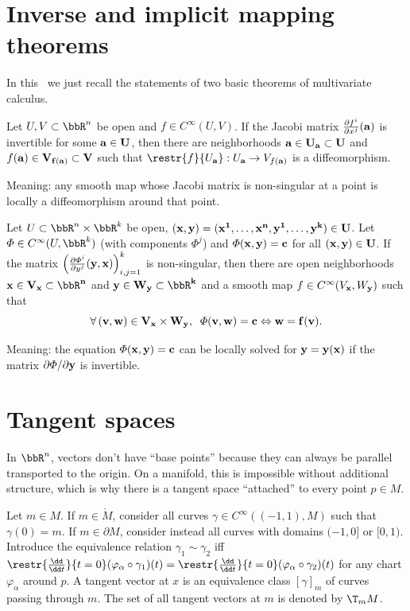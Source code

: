 \section{Inverse and implicit mapping theorems}

In this \sect\ we just recall the statements of two basic theorems of multivariate calculus.
\begin{thm}\label{InMT}
    Let $U,V\subset\bbR^n$ be open and $f\in C^\infty(U,V)$. If the Jacobi matrix $\frac{\partial f^i}{\partial x^j} (\bf{a})$ is invertible for some $\bf{a}\in U$, then there are neighborhoods $\bf{a}\in U_{\bf{a}}\subset U$ and $f(\bf{a})\in V_{f(\bf{a})}\subset V$ such that $\restr{f}{U_{\bf{a}}}:U_{\bf{a}}\to V_{f(\bf{a})}$ is a diffeomorphism.
\end{thm}
Meaning: any smooth map whose Jacobi matrix is non-singular at a point is locally a diffeomorphism around that point.

\begin{thm}\label{ImMT}
    Let $U\subset \bbR^n\times \bbR^k$ be open, $(\bf{x},\bf{y})=(x^1,\ldots,x^n,y^1,\ldots,y^k)\in U$. Let $\varPhi\in C^\infty(U,\bbR^k)$ (with components $\varPhi^j$) and $\varPhi(\bf{x},\bf{y})=\bf{c}$ for all $(\bf{x},\bf{y})\in U$. If the matrix $\left(\frac{\partial\varPhi^i}{\partial y^j}(\bf{y},\bf{x})\right)_{i,j=1}^k$  is non-singular, then there are open neighborhoods $\bf{x}\in V_{\bf{x}}\subset \bbR^n$ and $\bf{y}\in W_{\bf{y}}\subset\bbR^k$ and a smooth map $f\in C^\infty (V_{\bf{x}},W_{\bf{y}})$ such that 
\[\forall\,(\bf{v},\bf{w})\in V_{\bf{x}}\times W_{\bf{y}},\;\; \varPhi (\bf{v},\bf{w})=\bf{c} \Leftrightarrow \bf{w}=f(\bf{v}).\]
\end{thm}
Meaning: the equation $\varPhi(\bf{x},\bf{y})=\bf{c}$ can be locally solved for $\bf{y}=\bf{y}(\bf{x})$ if the matrix $\partial \varPhi/\partial\bf{y}$ is invertible.

\section{Tangent spaces}
    In $\bbR^n$, vectors don't have ``base points'' because they can always be parallel transported to the origin. On a manifold, this is impossible without additional structure, which is why there is a tangent space ``attached'' to every point $p\in M$. 
\begin{defn}
    Let $m\in M$. If $m\in \mathring M$, consider all curves $\gamma\in C^\infty((-1,1),M)$ such that $\gamma(0)=m$. If $m\in \partial M$, consider instead all curves with domains $(-1,0]$ or $[0,1)$. Introduce the equivalence relation $\gamma_1\sim \gamma_2$  iff $\restr{\frac{\dd}{\dd t}}{t=0}(\varphi_\alpha\circ \gamma_1)(t)=\restr{\frac{\dd}{\dd t}}{t=0}(\varphi_\alpha\circ \gamma_2)(t)$ for any chart $\varphi_\alpha$ around $p$. A tangent vector at $x$ is an equivalence class $[\gamma]_m$ of curves passing through $m$. The set of all tangent vectors at $m$ is denoted by $\T_m M$.
\end{defn}

